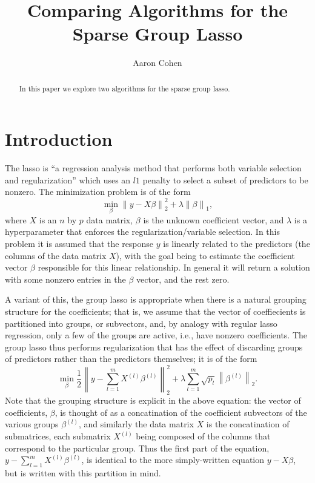\documentclass[titlepage]{article}
\title{Comparing Algorithms for the Sparse Group Lasso}
\author{Aaron Cohen}
\newcommand{\norm}[1]{\left\lVert #1 \right\rVert}
\begin{document}
    \maketitle
    \begin{abstract}
        In this paper we explore two algorithms for the sparse group lasso. 
    \end{abstract}

\section{Introduction}
\label{Sec:intro}
The lasso is ``a regression analysis method that performs both variable selection and regularization'' which uses an $l1$ penalty \citep{tibshirani1996regression} to select a subset of predictors to be nonzero. The minimization problem is of the form
\[
\min_{\beta} \norm{y-X\beta}_2^2 + \lambda \norm{\beta}_1,
\]
where $X$ is an $n$ by $p$ data matrix, $\beta$ is the unknown coefficient vector, and $\lambda$ is a hyperparameter that enforces the regularization/variable selection. In this problem it is assumed that the response $y$ is linearly related to the predictors (the columns of the data matrix $X$), with the goal being to estimate the coefficient vector $\beta$ responsible for this linear relationship. In general it will return a solution with some nonzero entries in the $\beta$ vector, and the rest zero.

A variant of this, the group lasso \citep{yuan2006model} is appropriate when there is a natural grouping structure for the coefficients; that is, we assume that the vector of coeffiecients is partitioned into groups, or subvectors, and, by analogy with regular lasso regression, only a few of the groups are active, i.e., have nonzero coefficients. The group lasso thus performs regularization that has the effect of discarding groups of predictors rather than the predictors themselves; it is of the form 
\[
\min_{\beta}\frac{1}{2}\norm{y-\sum_{l=1}^mX^{(l)}\beta^{(l)}}_2^2 + \lambda\sum_{l=1}^m\sqrt{p_l}\norm{\beta^{(l)}}_2.
\]
Note that the grouping structure is explicit in the above equation: the vector of coefficients, $\beta$, is thought of as a concatination of the coefficient subvectors of the various groups $\beta^{(l)}$, and similarly the data matrix $X$ is the concatination of submatrices, each submatrix $X^{(l)}$ being composed of the columns that correspond to the particular group. Thus the first part of the equation, $y-\sum_{l=1}^mX^{(l)}\beta^{(l)}$, is identical to the more simply-written equation $y-X\beta$, but is written with this partition in mind. 
\end{document}
